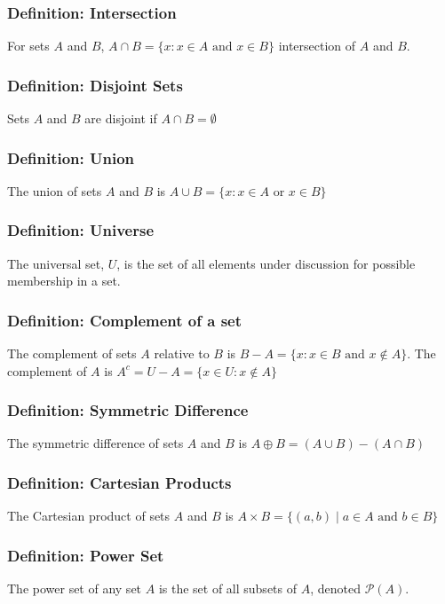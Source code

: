 \documentclass{article}
\begin{document}
\subsubsection*{Definition: Intersection}
For sets $A$ and $B$, $A \cap B = \{ x: x \in A \text{ and } x \in B \}$ intersection of $A$ and $B$.
\subsubsection*{Definition: Disjoint Sets}
Sets $A$ and $B$ are disjoint if $A \cap B = \emptyset$

\subsubsection*{Definition: Union}
The union of sets $A$ and $B$ is $A \cup B = \{ x: x \in A \text{ or } x \in B \}$

\subsubsection*{Definition: Universe}
The universal set, $U$, is the set of all elements under discussion for possible membership in a set. 

\subsubsection*{Definition: Complement of a set}
The complement of sets $A$ relative to $B$ is $B - A = \{ x: x \in B \text{ and } x \notin A \}$. The complement of $A$ is $A^c = U - A = \{ x \in U : x \notin A \}$

\subsubsection*{Definition: Symmetric Difference}
The symmetric difference of sets $A$ and $B$ is $A \oplus B = (A \cup B) - (A \cap B)$

\subsubsection*{Definition: Cartesian Products}
The Cartesian product of sets $A$ and $B$ is $A \times B = \{ (a,b) \mid a \in A \text{ and } b \in B \}$

\subsubsection*{Definition: Power Set}
The power set of any set $A$ is the set of all subsets of $A$, denoted $\mathcal{P} (A)$.
\end{document}
